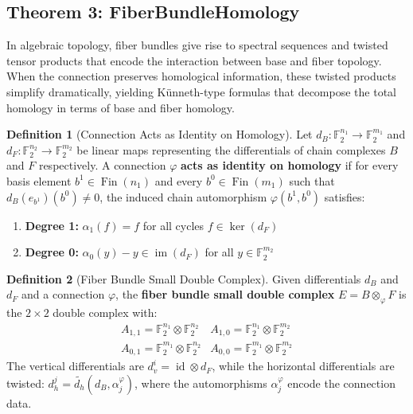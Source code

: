 \documentclass[11pt]{article}
\theoremstyle{plain}
\theoremstyle{definition}
\newtheorem*{definition}{Definition}
\theoremstyle{remark}
\renewcommand{\ker}{\operatorname{ker}}
\begin{document}
\vspace{1em}

\subsection{Theorem 3: FiberBundleHomology}

In algebraic topology, fiber bundles give rise to spectral sequences and twisted tensor products that encode the interaction between base and fiber topology. When the connection preserves homological information, these twisted products simplify dramatically, yielding Künneth-type formulas that decompose the total homology in terms of base and fiber homology.

\begin{definition}[Connection Acts as Identity on Homology]
Let $d_B : \mathbb{F}_2^{n_1} \to \mathbb{F}_2^{m_1}$ and $d_F : \mathbb{F}_2^{n_2} \to \mathbb{F}_2^{m_2}$ be linear maps representing the differentials of chain complexes $B$ and $F$ respectively. A connection $\varphi$ \textbf{acts as identity on homology} if for every basis element $b^1 \in \operatorname{Fin}(n_1)$ and every $b^0 \in \operatorname{Fin}(m_1)$ such that $d_B(e_{b^1})(b^0) \neq 0$, the induced chain automorphism $\varphi(b^1, b^0)$ satisfies:
\begin{enumerate}
\item \textbf{Degree 1:} $\alpha_1(f) = f$ for all cycles $f \in \ker(d_F)$
\item \textbf{Degree 0:} $\alpha_0(y) - y \in \operatorname{im}(d_F)$ for all $y \in \mathbb{F}_2^{m_2}$
\end{enumerate}
\end{definition}

\begin{definition}[Fiber Bundle Small Double Complex]
Given differentials $d_B$ and $d_F$ and a connection $\varphi$, the \textbf{fiber bundle small double complex} $E = B \otimes_\varphi F$ is the $2 \times 2$ double complex with:
\[
\begin{array}{cc}
A_{1,1} = \mathbb{F}_2^{n_1} \otimes \mathbb{F}_2^{n_2} & A_{1,0} = \mathbb{F}_2^{n_1} \otimes \mathbb{F}_2^{m_2} \\
A_{0,1} = \mathbb{F}_2^{m_1} \otimes \mathbb{F}_2^{n_2} & A_{0,0} = \mathbb{F}_2^{m_1} \otimes \mathbb{F}_2^{m_2}
\end{array}
\]
The vertical differentials are $d_v^i = \operatorname{id} \otimes d_F$, while the horizontal differentials are twisted: $d_h^j = \widetilde{d_h}(d_B, \alpha_j^\varphi)$, where the automorphisms $\alpha_j^\varphi$ encode the connection data.
\end{definition}
\end{document}
